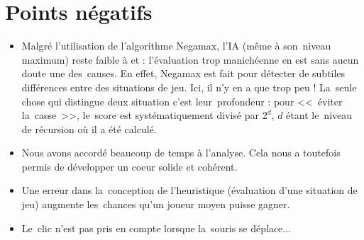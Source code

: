 \section{Points négatifs}
\begin{itemize}

	\item Malgré l'utilisation de l'algorithme Negamax, l'IA (même à son~niveau maximum) reste faible à \ttt{} et \cf{} : 
            l'évaluation trop manichéenne en est sans aucun doute une des~causes. En effet, Negamax est fait pour 
            détecter de subtiles différences entre des situations de jeu. Ici, il n'y en a que trop peu ! 
            La~seule chose qui distingue deux situation c'est leur~profondeur : pour <<~éviter la~casse~>>, 
            le~score est systématiquement divisé par $2^d$, $d$ étant le~niveau de récursion où il a été calculé. 
            
    \item Nous avons accordé beaucoup de temps à l'analyse. 
            Cela nous a toutefois permis de développer un coeur solide et cohérent.
    
    \item Une erreur dans la~conception de l'heuristique (évaluation d'une situation de jeu) 
            augmente les~chances qu'un joueur moyen puisse gagner.
    
    \item Le~clic n'est pas pris en compte lorsque la~souris se déplace...
    
\end{itemize}